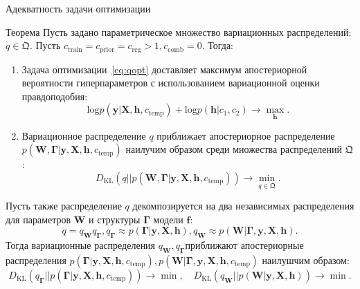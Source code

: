 \documentclass[usenames,dvipsnames,11pt,pdf,utf8,russian,aspectratio=43]{beamer}
\begin{document}
\begin{frame}{Адекватность задачи оптимизации}
\tiny   
\begin{block}{Теорема}
Пусть задано параметрическое множество вариационных распределений: $q \in \mathfrak{Q}$. 
Пусть $c_\text{train} = c_\text{prior}=c_\text{reg}>1, c_{\text{comb}}=0$. Тогда:
\begin{enumerate}
\item Задача оптимизации~\eqref{eq:qopt} доставляет максимум апостериорной вероятности гиперпараметров с использованием вариационной оценки правдоподобия:
\[
    \text{log}\hat{p}(\mathbf{y}|\mathbf{X}, \mathbf{h}, c_\text{temp}) + \text{log}p(\mathbf{h}|c_1,c_2) \to \max_{\mathbf{h}}.
\]
\item Вариационное распределение $q$ приближает апостериорное распределение $p(\mathbf{W}, \boldsymbol{\Gamma}|\mathbf{y}, \mathbf{X}, \mathbf{h}, c_\text{temp})$ наилучим образом среди множества распределений $\mathfrak{Q}$:
\[
    {D}_\text{KL}(q||p(\mathbf{W}, \boldsymbol{\Gamma}|\mathbf{y}, \mathbf{X}, \mathbf{h}, c_\text{temp})) \to \min_{q \in \mathfrak{Q}}.
\]
\end{enumerate}
\end{block}
\begin{block}{}
Пусть также распределение $q$ декомпозируется на два независимых распределения для параметров $\mathbf{W}$ и структуры $\boldsymbol{\Gamma}$ модели $\mathbf{f}$:
\[
    q = q_{\mathbf{W}}q_{\boldsymbol{\Gamma}}, q_{\boldsymbol{\Gamma}} \approx p(\boldsymbol{\Gamma}|\mathbf{y}, \mathbf{X}, \mathbf{h}), q_{\mathbf{W}} \approx p(\mathbf{W}|\boldsymbol{\Gamma},\mathbf{y}, \mathbf{X}, \mathbf{h}).
\]
Тогда вариационные распределения $q_{\mathbf{W}}, q_{\boldsymbol{\Gamma}}$приближают апостериорные распределения $ p(\boldsymbol{\Gamma}|\mathbf{y}, \mathbf{X}, \mathbf{h}, c_\text{temp}), p(\mathbf{W}|\boldsymbol{\Gamma},\mathbf{y}, \mathbf{X}, \mathbf{h}, c_\text{temp})$ наилушчим образом:
\[
    {D}_\text{KL}(q_{\boldsymbol{\Gamma}}||p(\boldsymbol{\Gamma}|\mathbf{y}, \mathbf{X}, \mathbf{h}, c_\text{temp})) \to \min, \quad
    {D}_\text{KL}(q_{\mathbf{W}}||p(\mathbf{W}|\mathbf{y}, \mathbf{X}, \mathbf{h})) \to \min.
\]

\end{block}
\end{frame}
\end{document}
